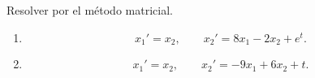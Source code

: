 Resolver por el método matricial.

\begin{enumerate}[label=(\alph*),ref=\alph*,leftmargin=*]
\item \[x_1'=x_2,\qquad x_2'=8x_1-2x_2+e^t.\]
\item \[x_1'=x_2,\qquad x_2'=-9x_1+6x_2+t.\]
\end{enumerate}
